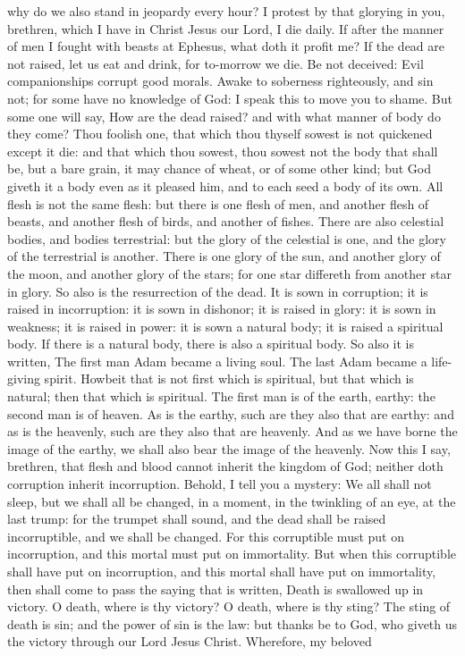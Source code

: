 why do we also stand in jeopardy every hour? I protest by that glorying in you, brethren, which I have in Christ Jesus our Lord, I die daily. If after the manner of men I fought with beasts at Ephesus, what doth it profit me? If the dead are not raised, let us eat and drink, for to-morrow we die. Be not deceived: Evil companionships corrupt good morals. Awake to soberness righteously, and sin not; for some have no knowledge of God: I speak this to move you to shame.  But some one will say, How are the dead raised? and with what manner of body do they come? Thou foolish one, that which thou thyself sowest is not quickened except it die: and that which thou sowest, thou sowest not the body that shall be, but a bare grain, it may chance of wheat, or of some other kind; but God giveth it a body even as it pleased him, and to each seed a body of its own. All flesh is not the same flesh: but there is one flesh of men, and another flesh of beasts, and another flesh of birds, and another of fishes. There are also celestial bodies, and bodies terrestrial: but the glory of the celestial is one, and the glory of the terrestrial is another. There is one glory of the sun, and another glory of the moon, and another glory of the stars; for one star differeth from another star in glory. So also is the resurrection of the dead. It is sown in corruption; it is raised in incorruption: it is sown in dishonor; it is raised in glory: it is sown in weakness; it is raised in power: it is sown a natural body; it is raised a spiritual body. If there is a natural body, there is also a spiritual body. So also it is written, The first man Adam became a living soul. The last Adam became a life-giving spirit. Howbeit that is not first which is spiritual, but that which is natural; then that which is spiritual. The first man is of the earth, earthy: the second man is of heaven. As is the earthy, such are they also that are earthy: and as is the heavenly, such are they also that are heavenly. And as we have borne the image of the earthy, we shall also bear the image of the heavenly.  Now this I say, brethren, that flesh and blood cannot inherit the kingdom of God; neither doth corruption inherit incorruption. Behold, I tell you a mystery: We all shall not sleep, but we shall all be changed, in a moment, in the twinkling of an eye, at the last trump: for the trumpet shall sound, and the dead shall be raised incorruptible, and we shall be changed. For this corruptible must put on incorruption, and this mortal must put on immortality. But when this corruptible shall have put on incorruption, and this mortal shall have put on immortality, then shall come to pass the saying that is written, Death is swallowed up in victory. O death, where is thy victory? O death, where is thy sting? The sting of death is sin; and the power of sin is the law: but thanks be to God, who giveth us the victory through our Lord Jesus Christ. Wherefore, my beloved 